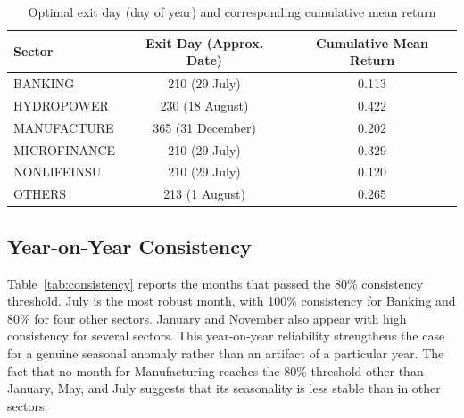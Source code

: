\documentclass[12pt,a4paper,fleqn]{article}
\begin{document}
\begin{table}[ht]
\centering
\caption{Optimal exit day (day of year) and corresponding cumulative mean return}
\label{tab:optimalexit}
\begin{tabular}{lcc}
\toprule
Sector & Exit Day (Approx. Date) & Cumulative Mean Return \\
\midrule
BANKING       & 210 (29 July)   & 0.113 \\
HYDROPOWER    & 230 (18 August) & 0.422 \\
MANUFACTURE   & 365 (31 December) & 0.202 \\
MICROFINANCE  & 210 (29 July)   & 0.329 \\
NONLIFEINSU   & 210 (29 July)   & 0.120 \\
OTHERS        & 213 (1 August)  & 0.265 \\
\bottomrule
\end{tabular}
\end{table}

\subsection{Year-on-Year Consistency}

Table~\ref{tab:consistency} reports the months that passed the 80\% consistency threshold. July is the most robust month, with 100\% consistency for Banking and 80\% for four other sectors. January and November also appear with high consistency for several sectors. This year-on-year reliability strengthens the case for a genuine seasonal anomaly rather than an artifact of a particular year. The fact that no month for Manufacturing reaches the 80\% threshold other than January, May, and July suggests that its seasonality is less stable than in other sectors.
\end{document}
